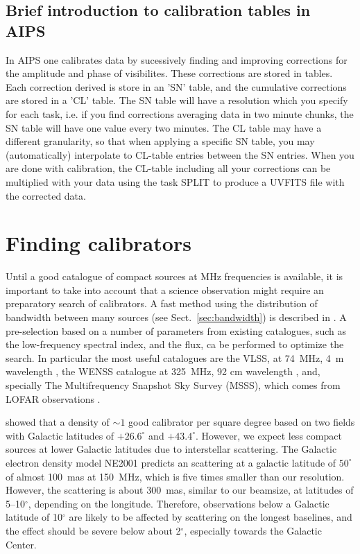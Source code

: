 \documentclass[graybox]{svmult}
\begin{document}
\subsection{Brief introduction to calibration tables in AIPS}\label{sec:aips}

In AIPS one calibrates data by sucessively finding and improving corrections
for the amplitude and phase of visibilites. These corrections are stored in
tables.  Each correction derived is store in an 'SN' table, and the cumulative
corrections are stored in a 'CL' table. The SN table will have a resolution
which you specify for each task, i.e. if you find corrections averaging data in
two minute chunks, the SN table will have one value every two minutes. The CL
table may have a different granularity, so that when applying a specific SN
table, you may (automatically) interpolate to CL-table entries between the SN
entries. When you are done with calibration, the CL-table including all your
corrections can be multiplied with your data using the task SPLIT to produce a
UVFITS file with the corrected data.

\section{Finding calibrators}

Until a good catalogue of compact sources at MHz frequencies is available, it
is important to take into account that a science observation might require an
preparatory search of calibrators. A fast method using the distribution of
bandwidth between many sources (see Sect.~\ref{sec:bandwidth}) is described in
\cite{moldon14}. A pre-selection based on a number of parameters from existing
catalogues, such as the low-frequency spectral index, and the flux, ca be
performed to optimize the search. In particular the most useful catalogues are
the VLSS, at 74~MHz, 4~m wavelength \citep{lane12a}, the WENSS catalogue at
325~MHz, 92 cm wavelength \citep{rengelink97}, and, specially The
Multifrequency Snapshot Sky Survey (MSSS), which comes from LOFAR observations
\citep{heald14}. 

\cite{moldon14} showed that a density of $\sim1$ good calibrator per square
degree based on two fields with Galactic latitudes of $+26.6^{\circ}$ and
$+43.4^{\circ} $. However, we expect less compact sources at lower Galactic
latitudes due to interstellar scattering. The Galactic electron density model
NE2001 \citep{cordes02} predicts an scattering at a galactic latitude of
$50^{\circ}$ of almost 100~mas at 150~MHz, which is five times smaller than our
resolution. However, the scattering is about 300~mas, similar to our beamsize,
at latitudes of 5--10$^{\circ}$, depending on the longitude. Therefore,
observations below a Galactic latitude of 10$^{\circ}$ are likely to be
affected by scattering on the longest baselines, and the effect should be
severe below about 2$^{\circ}$, especially towards the Galactic Center. 
\end{document}

